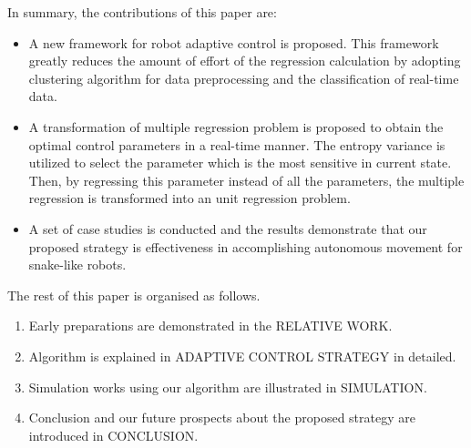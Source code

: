 In summary, the contributions of this paper are:
\begin{itemize}
	\item A new framework for robot adaptive control is proposed.
 	      This framework greatly reduces the amount of  effort of the regression calculation 
           by adopting clustering algorithm for data preprocessing and the classification of 
           real-time data.
	\item A transformation of multiple regression problem is proposed to obtain the optimal
          control parameters in a real-time manner.
         The entropy variance is utilized to select the parameter which is the most sensitive 
         in current state. Then, by regressing this parameter instead of all the parameters, the 
         multiple regression is transformed into an unit regression problem.
    \item A set of case studies is conducted and the results demonstrate
    that our proposed strategy is effectiveness in accomplishing autonomous movement for snake-like robots.
\end{itemize}

The rest of this paper is organised as follows. 
\begin{enumerate}
	\item Early preparations are demonstrated in the RELATIVE WORK.
	\item Algorithm is explained in ADAPTIVE CONTROL STRATEGY in detailed.
	\item Simulation works using our algorithm are illustrated in SIMULATION.
	\item Conclusion and our future prospects about the proposed strategy are introduced in CONCLUSION.
\end{enumerate}







